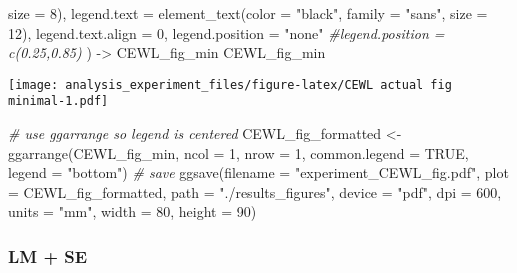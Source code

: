 \documentclass[
]{article}
\newenvironment{Shaded}{\begin{snugshade}}{\end{snugshade}}
\newcommand{\AttributeTok}[1]{\textcolor[rgb]{0.77,0.63,0.00}{#1}}
\newcommand{\CommentTok}[1]{\textcolor[rgb]{0.56,0.35,0.01}{\textit{#1}}}
\newcommand{\ConstantTok}[1]{\textcolor[rgb]{0.00,0.00,0.00}{#1}}
\newcommand{\DecValTok}[1]{\textcolor[rgb]{0.00,0.00,0.81}{#1}}
\newcommand{\FunctionTok}[1]{\textcolor[rgb]{0.00,0.00,0.00}{#1}}
\newcommand{\NormalTok}[1]{#1}
\newcommand{\OtherTok}[1]{\textcolor[rgb]{0.56,0.35,0.01}{#1}}
\newcommand{\StringTok}[1]{\textcolor[rgb]{0.31,0.60,0.02}{#1}}
\begin{document}
\begin{Shaded}
\begin{Highlighting}[]
                                 \AttributeTok{size =} \DecValTok{8}\NormalTok{),}
        \AttributeTok{legend.text =} \FunctionTok{element\_text}\NormalTok{(}\AttributeTok{color =} \StringTok{"black"}\NormalTok{, }
                                 \AttributeTok{family =} \StringTok{"sans"}\NormalTok{, }
                                 \AttributeTok{size =} \DecValTok{12}\NormalTok{),}
        \AttributeTok{legend.text.align =} \DecValTok{0}\NormalTok{,}
        \AttributeTok{legend.position =} \StringTok{"none"}
        \CommentTok{\#legend.position = c(0.25,0.85)}
\NormalTok{        ) }\OtherTok{{-}\textgreater{}}\NormalTok{ CEWL\_fig\_min}
\NormalTok{CEWL\_fig\_min}
\end{Highlighting}
\end{Shaded}

\texttt{[image: analysis\_experiment\_files/figure-latex/CEWL actual fig minimal-1.pdf]}

\begin{Shaded}
\begin{Highlighting}[]
\CommentTok{\# use ggarrange so legend is centered}
\NormalTok{CEWL\_fig\_formatted }\OtherTok{\textless{}{-}} \FunctionTok{ggarrange}\NormalTok{(CEWL\_fig\_min,}
                                \AttributeTok{ncol =} \DecValTok{1}\NormalTok{, }\AttributeTok{nrow =} \DecValTok{1}\NormalTok{,}
                                \AttributeTok{common.legend =} \ConstantTok{TRUE}\NormalTok{,}
                                \AttributeTok{legend =} \StringTok{"bottom"}\NormalTok{)}
\CommentTok{\# save}
\FunctionTok{ggsave}\NormalTok{(}\AttributeTok{filename =} \StringTok{"experiment\_CEWL\_fig.pdf"}\NormalTok{,}
       \AttributeTok{plot =}\NormalTok{ CEWL\_fig\_formatted,}
       \AttributeTok{path =} \StringTok{"./results\_figures"}\NormalTok{,}
       \AttributeTok{device =} \StringTok{"pdf"}\NormalTok{,}
       \AttributeTok{dpi =} \DecValTok{600}\NormalTok{,}
       \AttributeTok{units =} \StringTok{"mm"}\NormalTok{,}
       \AttributeTok{width =} \DecValTok{80}\NormalTok{, }\AttributeTok{height =} \DecValTok{90}\NormalTok{)}
\end{Highlighting}
\end{Shaded}

\hypertarget{lm-se-2}{%
\subsubsection{LM + SE}\label{lm-se-2}}
\end{document}

